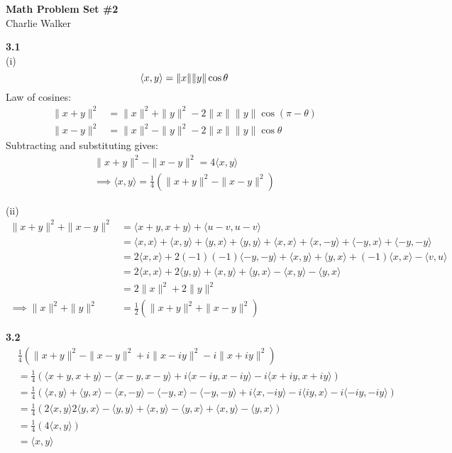 \documentclass[letterpaper,12pt]{article}
\theoremstyle{definition}
\begin{document}
\begin{flushleft}
  \textbf{\large{Math Problem Set \#2}} \\
  Charlie Walker
\end{flushleft}

\vspace{5mm}

\noindent\textbf{3.1}\\

\noindent(i) \begin{equation*}
\langle x,y \rangle = \|x\|\|y\|\cos \theta \\
\end{equation*}
Law of cosines:
\begin{align*}
\|x+y\|^2 &= \|x\|^2 + \|y\|^2 - 2\|x\|\|y\|\cos(\pi-\theta)\\
\|x-y\|^2 &= \|x\|^2 - \|y\|^2 - 2\|x\|\|y\|\cos\theta
\end{align*}
Subtracting and substituting gives:
\begin{align*}
\|x+y\|^2 - \|x-y\|^2 = 4\langle x,y \rangle\\
\implies \langle x,y \rangle = \frac{1}{4}(\|x+y\|^2 - \|x-y\|^2)
\end{align*}

\noindent(ii) \begin{align*}
\|x+y\|^2 + \|x-y\|^2 &= \langle x+y, x+y \rangle + \langle u-v, u-v \rangle\\
&=\langle x,x \rangle + \langle x,y \rangle + \langle y,x \rangle + \langle y,y \rangle + \langle x,x \rangle + \langle x,-y \rangle + \langle -y,x \rangle + \langle -y,-y \rangle\\
&= 2\langle x,x \rangle + 2(-1)(-1)\langle -y,-y \rangle + \langle x,y \rangle + \langle y,x \rangle + (-1)\langle x,x \rangle - \langle v,u \rangle\\
&= 2\langle x,x \rangle + 2\langle y,y \rangle + \langle x,y\rangle + \langle y,x \rangle - \langle x,y\rangle - \langle y,x \rangle\\
&= 2\|x\|^2 + 2\|y\|^2\\
\implies \|x\|^2 + \|y\|^2 &= \frac{1}{2}(\|x+y\|^2 + \|x-y\|^2)
\end{align*}

\noindent\textbf{3.2}\\
\begin{align*}
&\frac{1}{4}(\|x+y\|^2 - \|x-y\|^2 + i\|x-iy\|^2 - i\|x+iy\|^2) \\
&= \frac{1}{4}(\langle x+y,x+y \rangle - \langle x-y,x-y \rangle + i\langle x-iy, x-iy \rangle - i\langle x+iy, x+iy \rangle)\\
&=\frac{1}{4}(\langle x,y \rangle + \langle y,x \rangle - \langle x,-y \rangle - \langle -y, x\rangle - \langle -y,-y \rangle + i\langle x, -iy \rangle - i\langle iy,x \rangle - i\langle -iy, -iy \rangle)\\
&= \frac{1}{4}(2\langle x,y \rangle 2\langle y,x \rangle - \langle y,y \rangle + \langle x,y \rangle - \langle y,x \rangle + \langle x,y \rangle - \langle y,x \rangle)\\
&= \frac{1}{4}(4\langle x,y\rangle)\\
&= \langle x,y \rangle
\end{align*}
\end{document}
